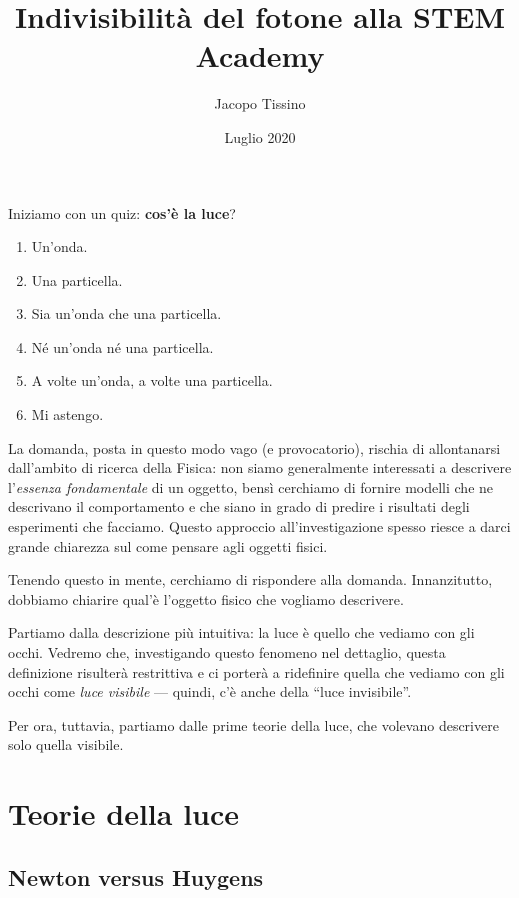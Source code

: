 \documentclass[a4paper,12pt]{article}
\author{Jacopo Tissino}
\title{Indivisibilità del fotone alla STEM Academy}
\date{Luglio 2020}
\begin{document}
\maketitle

\tableofcontents

\medskip

Iniziamo con un quiz: \textbf{cos'è la luce}?

\begin{enumerate}[label=\emph{\alph*})]
    \item Un'onda.
    \item Una particella.
    \item Sia un'onda che una particella. 
    \item Né un'onda né una particella. 
    \item A volte un'onda, a volte una particella.
    \item Mi astengo.
\end{enumerate}

La domanda, posta in questo modo vago (e provocatorio), rischia di allontanarsi dall'ambito di ricerca della Fisica: non siamo generalmente interessati a descrivere l'\emph{essenza fondamentale} di un oggetto, bensì cerchiamo di fornire modelli che ne descrivano il comportamento e che siano in grado di predire i risultati degli esperimenti che facciamo. 
Questo approccio all'investigazione spesso riesce a darci grande chiarezza sul come pensare agli oggetti fisici. 


Tenendo questo in mente, cerchiamo di rispondere alla domanda.
Innanzitutto, dobbiamo chiarire qual'è l'oggetto fisico che vogliamo descrivere.

Partiamo dalla descrizione più intuitiva: la luce è quello che vediamo con gli occhi. 
Vedremo che, investigando questo fenomeno nel dettaglio, questa definizione risulterà restrittiva e ci porterà a ridefinire quella che vediamo con gli occhi come \emph{luce visibile} --- quindi, c'è anche della ``luce invisibile''.

Per ora, tuttavia, partiamo dalle prime teorie della luce, che volevano descrivere solo quella visibile.

\section{Teorie della luce}

\subsection{Newton versus Huygens} \label{sec:newton-vs-huygens}
\end{document}
